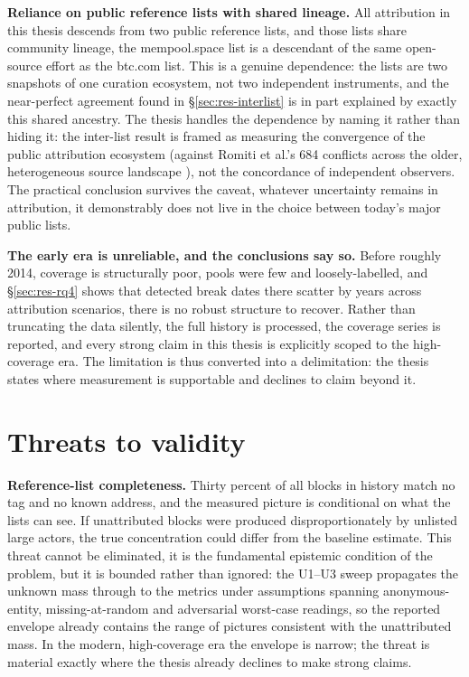 \documentclass[logo,msc]{infthesis}           %
\begin{document}
\textbf{Reliance on public reference lists with shared lineage.} All
attribution in this thesis descends from two public reference lists, and those
lists share community lineage, the mempool.space list is a descendant of
the same open-source effort as the btc.com list. This is a genuine dependence:
the lists are two snapshots of one curation ecosystem, not two independent
instruments, and the near-perfect agreement found in \S\ref{sec:res-interlist}
is in part explained by exactly this shared ancestry. The thesis handles the
dependence by naming it rather than hiding it: the inter-list result is
framed as measuring the convergence of the public attribution ecosystem
(against Romiti et al.'s 684 conflicts across the older, heterogeneous source
landscape \cite{romiti2019deep}), not the concordance of independent
observers. The practical conclusion survives the caveat, whatever
uncertainty remains in attribution, it demonstrably does not live in the
choice between today's major public lists.

\textbf{The early era is unreliable, and the conclusions say so.} Before
roughly 2014, coverage is structurally poor, pools were few and
loosely-labelled, and \S\ref{sec:res-rq4} shows that detected break dates
there scatter by years across attribution scenarios, there is no robust
structure to recover. Rather than truncating the data silently, the full
history is processed, the coverage series is reported, and every strong claim
in this thesis is explicitly scoped to the high-coverage era. The limitation
is thus converted into a delimitation: the thesis states where measurement is
supportable and declines to claim beyond it.

\section{Threats to validity}
\label{sec:disc-validity}

\textbf{Reference-list completeness.} Thirty percent of all blocks in history
match no tag and no known address, and the measured picture is conditional on
what the lists can see. If unattributed blocks were produced
disproportionately by unlisted large actors, the true concentration could
differ from the baseline estimate. This threat cannot be eliminated, it is
the fundamental epistemic condition of the problem, but it is bounded
rather than ignored: the U1--U3 sweep propagates the unknown mass through to
the metrics under assumptions spanning anonymous-entity, missing-at-random and
adversarial worst-case readings, so the reported envelope already contains
the range of pictures consistent with the unattributed mass. In the modern,
high-coverage era the envelope is narrow; the threat is material exactly
where the thesis already declines to make strong claims.
\end{document}
